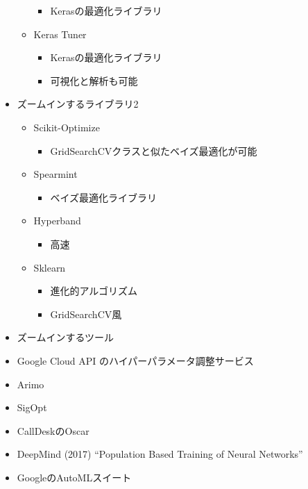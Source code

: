 \begin{itemize}
\begin{itemize}
    \begin{itemize}
    \tightlist
    \item
      Kerasの最適化ライブラリ
    \end{itemize}
  \item
    Keras Tuner

    \begin{itemize}
    \tightlist
    \item
      Kerasの最適化ライブラリ
    \item
      可視化と解析も可能
    \end{itemize}
  \end{itemize}
\item
  ズームインするライブラリ2

  \begin{itemize}
  \tightlist
  \item
    Scikit-Optimize

    \begin{itemize}
    \tightlist
    \item
      GridSearchCVクラスと似たベイズ最適化が可能
    \end{itemize}
  \item
    Spearmint

    \begin{itemize}
    \tightlist
    \item
      ベイズ最適化ライブラリ
    \end{itemize}
  \item
    Hyperband

    \begin{itemize}
    \tightlist
    \item
      高速
    \end{itemize}
  \item
    Sklearn

    \begin{itemize}
    \tightlist
    \item
      進化的アルゴリズム
    \item
      GridSearchCV風
    \end{itemize}
  \end{itemize}
\item
  ズームインするツール
\item
  Google Cloud API のハイパーパラメータ調整サービス
\item
  Arimo
\item
  SigOpt
\item
  CallDeskのOscar
\item
  DeepMind (2017) ``Population Based Training of Neural Networks''
\item
  GoogleのAutoMLスイート
\end{itemize}

